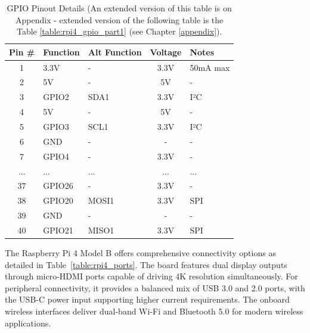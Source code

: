 {	\begin{table}[h!]
		\centering
		\caption{GPIO Pinout Details (An extended version of this table is on Appendix - extended version of the following table is the Table \ref{table:rpi4_gpio_part1} (see Chapter \ref{appendix}).}
		\label{table:rpi4_gpio}
		\begin{tabular}{|c|l|l|c|l|}
			\hline
			\textbf{Pin \#} & \textbf{Function} & \textbf{Alt Function} & \textbf{Voltage} & \textbf{Notes} \\ \hline
			1 & 3.3V & - & 3.3V & 50mA max \\ \hline
			2 & 5V & - & 5V & - \\ \hline
			3 & GPIO2 & SDA1 & 3.3V & I²C \\ \hline
			4 & 5V & - & 5V & - \\ \hline
			5 & GPIO3 & SCL1 & 3.3V & I²C \\ \hline
			6 & GND & - & - & - \\ \hline
			7 & GPIO4 & - & 3.3V & - \\ \hline
			... & ... & ... & ... & ... \\ \hline
			37 & GPIO26 & - & 3.3V & - \\ \hline
			38 & GPIO20 & MOSI1 & 3.3V & SPI \\ \hline
			39 & GND & - & - & - \\ \hline
			40 & GPIO21 & MISO1 & 3.3V & SPI \\ \hline
		\end{tabular}
	\end{table}

	The Raspberry Pi 4 Model B offers comprehensive connectivity options as detailed in Table~\ref{table:rpi4_ports}. The board features dual display outputs through micro-HDMI ports capable of driving 4K resolution simultaneously. For peripheral connectivity, it provides a balanced mix of USB 3.0 and 2.0 ports, with the USB-C power input supporting higher current requirements. The onboard wireless interfaces deliver dual-band Wi-Fi and Bluetooth 5.0 for modern wireless applications.
	
}
